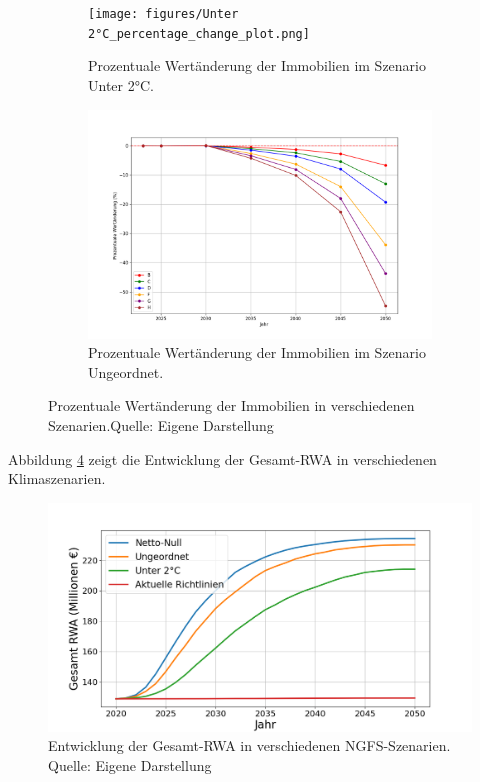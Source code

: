 \begin{figure}[htbp]
    \vspace{1em}
    
    \begin{subfigure}[b]{0.48\textwidth}
        \centering
        \texttt{[image: figures/Unter 2°C\_percentage\_change\_plot.png]}
        \caption{Prozentuale Wertänderung der Immobilien im Szenario Unter 2°C.}
        \label{fig:unter_2c}
    \end{subfigure}
    \hfill
    \begin{subfigure}[b]{0.48\textwidth}
        \centering
        \includegraphics[width=\textwidth]{figures/Ungeordnet_percentage_change_plot.png}
        \caption{Prozentuale Wertänderung der Immobilien im Szenario Ungeordnet.}
        \label{fig:ungeordnet}
    \end{subfigure}
    \caption{Prozentuale Wertänderung der Immobilien in verschiedenen Szenarien.Quelle: Eigene Darstellung}
    \label{fig:all_scenarios}
\end{figure}

Abbildung \ref{fig:gesamt_rwa_plot} zeigt die Entwicklung der Gesamt-\acs{RWA} in verschiedenen Klimaszenarien.
\begin{figure}[htbp]
    \centering
    \includegraphics[width=\textwidth]{figures/gesamt_rwa_plot.png}
    \caption{Entwicklung der Gesamt-RWA in verschiedenen NGFS-Szenarien. Quelle: Eigene Darstellung}
    \label{fig:gesamt_rwa_plot}
\end{figure}
\FloatBarrier